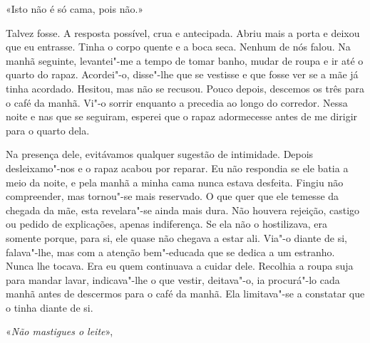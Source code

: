 «Isto não é só cama, pois não.»

Talvez fosse. A resposta possível, crua e antecipada. Abriu mais a porta
e deixou que eu entrasse. Tinha o corpo quente e a boca seca. Nenhum de
nós falou. Na manhã seguinte, levantei"-me a tempo de tomar banho, mudar
de roupa e ir até o quarto do rapaz. Acordei"-o, disse"-lhe que se
vestisse e que fosse ver se a mãe já tinha acordado. Hesitou, mas não se
recusou. Pouco depois, descemos os três para o café da manhã. Vi"-o
sorrir enquanto a precedia ao longo do corredor. Nessa noite e nas que
se seguiram, esperei que o rapaz adormecesse antes de me dirigir para o
quarto dela.

Na presença dele, evitávamos qualquer sugestão de intimidade. Depois
desleixamo"-nos e o rapaz acabou por reparar. Eu não respondia se ele
batia a meio da noite, e pela manhã a minha cama nunca estava desfeita.
Fingiu não compreender, mas tornou"-se mais reservado. O que quer que
ele temesse da chegada da mãe, esta revelara"-se ainda mais dura. Não
houvera rejeição, castigo ou pedido de explicações, apenas indiferença.
Se ela não o hostilizava, era somente porque, para si, ele quase não
chegava a estar ali. Via"-o diante de si, falava"-lhe, mas com a atenção
bem"-educada que se dedica a um estranho. Nunca lhe tocava. Era eu quem
continuava a cuidar dele. Recolhia a roupa suja para mandar lavar,
indicava"-lhe o que vestir, deitava"-o, ia procurá"-lo cada manhã antes
de descermos para o café da manhã. Ela limitava"-se a constatar que o
tinha diante de si.

«\emph{Não mastigues o leite}»,

